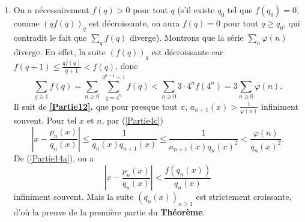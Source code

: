 \documentclass[french]{article}
\theoremstyle{definition}
\newcommand{\abs}[1]{\left|#1\right|}
\begin{document}
\begin{enumerate}
\begin{enumerate}
            \item \label{Partie14b} On a n\'ecessairement $f(q) > 0$ pour tout $q$ (s'il existe $q_0$ tel que $f(q_0) = 0$, comme $(qf(q))_{q}$ est d\'ecroissante, on aura $f(q) = 0$ pour tout $q \ge q_0$, qui contradit le fait que $\sum_q f(q)$ diverge). Montrons que la s\'erie $\sum_n \varphi(n)$ diverge. En effet, la suite $(f(q))_q$ est d\'ecroissante car $f(q+1) \le \frac{qf(q)}{q+1} < f(q)$, donc
                $$\sum_{q \ge 1} f(q) = \sum_{n \ge 0} \sum_{q = 4^n}^{4^{n+1} - 1} f(q) < \sum_{n \ge 0} 3 \cdot 4^n f(4^{n}) = 3\sum_{n \ge 0}\varphi(n).$$
            Il suit de {\bf \ref{Partie12}.} que pour presque tout $x$, $a_{n+1}(x) > \frac{1}{\varphi(n)}$ infiniment souvent. Pour tel $x$ et $n$, par (\ref{Partie4c})
                $$\abs{x - \frac{p_n(x)}{q_n(x)}} \le \frac{1}{q_n(x)q_{n+1}(x)} \le \frac{1}{a_{n+1}(x)q_n(x)^2} < \frac{\varphi(n)}{q_n(x)^2}.$$
            De (\ref{Partie14a}), on a
                $$\abs{x - \frac{p_n(x)}{q_n(x)}} < \frac{f(q_n(x))}{q_n(x)}$$
            infiniment souvent. Mais la suite $(q_n(x))_{n \ge 1}$ est strictement croissante, d'o\`u la preuve de la premi\`ere partie du {\bf Th\'eor\`eme}.
        \end{enumerate}
\end{enumerate}
\end{document}
